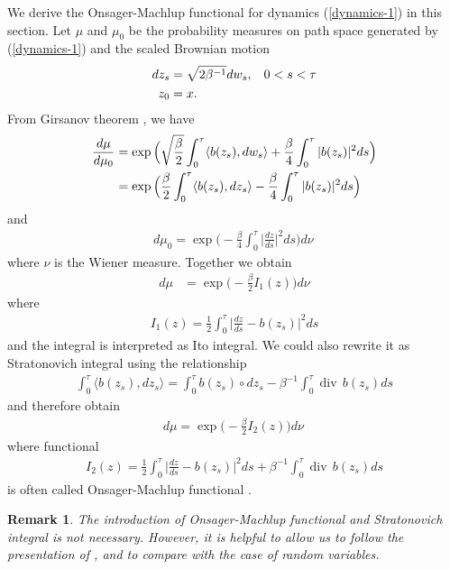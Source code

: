 \documentclass[final]{siamltex}
\newtheorem{remark}{Remark}
\begin{document}
We derive the Onsager-Machlup functional for dynamics (\ref{dynamics-1}) in
this section.
Let $\mu$ and $\mu_0$ be the probability measures on path space generated by
(\ref{dynamics-1}) and the scaled Brownian motion
\begin{align}
  \begin{split}
  dz_s &= \sqrt{2\beta^{-1}}dw_s, \hspace{3mm} 0 < s < \tau \\
   z_0 &= x .
  \end{split}
\end{align}
From Girsanov theorem \cite{oksendalSDE}, we have 
\begin{align}
  \frac{d\mu}{d\mu_0} &= \exp\Big(\sqrt{\frac{\beta}{2}}\int_0^\tau
  \langle b(z_s), dw_s\rangle + \frac{\beta}{4}\int_0^\tau |b(z_s)|^2ds\Big) \notag\\
  &=\exp\Big(\frac{\beta}{2}\int_0^\tau \langle b(z_s),dz_s\rangle -
  \frac{\beta}{4}\int_0^\tau |b(z_s)|^2ds\Big) 
\end{align}
and
\begin{align}
  d\mu_0 = \exp\Big(-\frac{\beta}{4}\int_0^\tau
  \Big|\frac{dz}{ds}\Big|^2ds\Big) d\nu\,
\end{align}
where $\nu$ is the Wiener measure. Together we obtain
\begin{align}
  d\mu &=\exp\Big(-\frac{\beta}{2} I_{1}(z)\Big)d\nu
  \label{measure-1}
\end{align}
where
\begin{align}
  I_{1}(z) = \frac{1}{2}\int_0^\tau \Big|\frac{dz}{ds} - b(z_s)\Big|^2 ds
\end{align}
and the integral is interpreted as Ito integral.
We could also rewrite it as Stratonovich integral using the relationship
\begin{align}
  \int_0^\tau \langle b(z_s), dz_s\rangle = \int_0^\tau b(z_s) \circ dz_s - \beta^{-1} \int_0^\tau \operatorname{div}\,b(z_s) ds
\end{align}
and therefore obtain 
\begin{align}
  d\mu = \exp \Big(-\frac{\beta}{2} I_2(z) \Big) d\nu\,
\end{align}
where functional 
\begin{align}
  I_2(z) = \frac{1}{2}\int_0^\tau \Big|\frac{dz}{ds}- b(z_s)\Big|^2 ds +
  \beta^{-1} \int_0^\tau \operatorname{div}\,b(z_s) ds
  \label{om-fun}
\end{align}
is often called Onsager-Machlup functional \cite{om1978, om_functional_pinski}. 
\begin{remark}
  The introduction of Onsager-Machlup functional and Stratonovich integral is
  not necessary. However, it is helpful to allow us to follow the presentation of
  \cite{ce_tutorial}, \cite{ce_book} and to compare with the case of random
  variables.
\end{remark}
\end{document}
